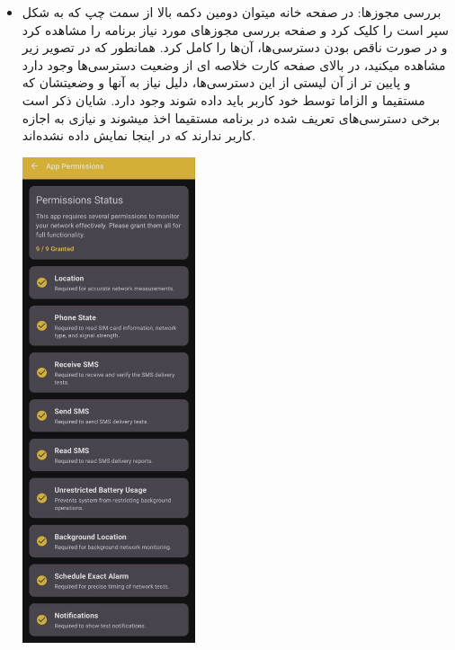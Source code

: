 \begin{itemize}
\begin{itemize}
            \item  بررسی مجوزها:
		در صفحه خانه میتوان دومین دکمه بالا از سمت چپ که به شکل سپر است را کلیک کرد و صفحه بررسی مجوزهای مورد نیاز برنامه را مشاهده کرد و در صورت ناقص بودن دسترسی‌ها، آن‌ها را کامل کرد.
        همانطور که در تصویر زیر مشاهده میکنید، در بالای صفحه کارت خلاصه ای از وضعیت دسترسی‌ها وجود دارد و پایین تر از آن لیستی از این دسترسی‌ها، دلیل نیاز به آنها و وضعیتشان که مستقیما و الزاما توسط خود کاربر باید داده شوند وجود دارد. شایان ذکر است برخی دسترسی‌‌های تعریف شده در برنامه مستقیما اخذ میشوند و نیازی به اجازه کاربر ندارند که در اینجا نمایش داده نشده‌اند.
            \begin{center}
		\includegraphics[width=0.4\textwidth]{images/PermissionAll.jpeg}
		\end{center}
        

\end{itemize}
\end{itemize}
